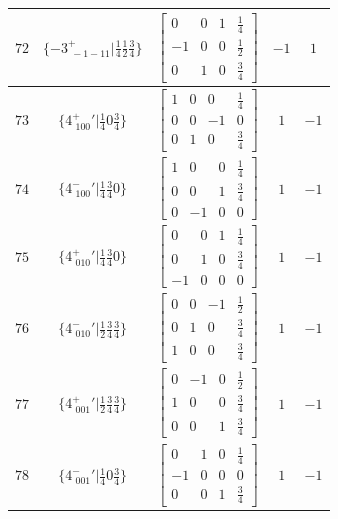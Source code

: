 \documentclass[fleqn,8pt]{jsarticle}
\begin{document}
\begin{longtable}{ccccc}
$ 72 $ & $ \{-3^{+}_{\,\,-1-11}|\frac{1}{4} \frac{1}{2} \frac{3}{4}\} $ & $ \begin{bmatrix} 0 & 0 & 1 & \frac{1}{4} \\ -1 & 0 & 0 & \frac{1}{2} \\ 0 & 1 & 0 & \frac{3}{4} \end{bmatrix} $ & $ -1 $ & $ 1 $ \\ \hline
$ 73 $ & $ \{4^{+}_{\,\,100}{}'|\frac{1}{4} 0 \frac{3}{4}\} $ & $ \begin{bmatrix} 1 & 0 & 0 & \frac{1}{4} \\ 0 & 0 & -1 & 0 \\ 0 & 1 & 0 & \frac{3}{4} \end{bmatrix} $ & $ 1 $ & $ -1 $ \\ \hline
$ 74 $ & $ \{4^{-}_{\,\,100}{}'|\frac{1}{4} \frac{3}{4} 0\} $ & $ \begin{bmatrix} 1 & 0 & 0 & \frac{1}{4} \\ 0 & 0 & 1 & \frac{3}{4} \\ 0 & -1 & 0 & 0 \end{bmatrix} $ & $ 1 $ & $ -1 $ \\ \hline
$ 75 $ & $ \{4^{+}_{\,\,010}{}'|\frac{1}{4} \frac{3}{4} 0\} $ & $ \begin{bmatrix} 0 & 0 & 1 & \frac{1}{4} \\ 0 & 1 & 0 & \frac{3}{4} \\ -1 & 0 & 0 & 0 \end{bmatrix} $ & $ 1 $ & $ -1 $ \\ \hline
$ 76 $ & $ \{4^{-}_{\,\,010}{}'|\frac{1}{2} \frac{3}{4} \frac{3}{4}\} $ & $ \begin{bmatrix} 0 & 0 & -1 & \frac{1}{2} \\ 0 & 1 & 0 & \frac{3}{4} \\ 1 & 0 & 0 & \frac{3}{4} \end{bmatrix} $ & $ 1 $ & $ -1 $ \\ \hline
$ 77 $ & $ \{4^{+}_{\,\,001}{}'|\frac{1}{2} \frac{3}{4} \frac{3}{4}\} $ & $ \begin{bmatrix} 0 & -1 & 0 & \frac{1}{2} \\ 1 & 0 & 0 & \frac{3}{4} \\ 0 & 0 & 1 & \frac{3}{4} \end{bmatrix} $ & $ 1 $ & $ -1 $ \\ \hline
$ 78 $ & $ \{4^{-}_{\,\,001}{}'|\frac{1}{4} 0 \frac{3}{4}\} $ & $ \begin{bmatrix} 0 & 1 & 0 & \frac{1}{4} \\ -1 & 0 & 0 & 0 \\ 0 & 0 & 1 & \frac{3}{4} \end{bmatrix} $ & $ 1 $ & $ -1 $ \\ \hline

\end{longtable}
\end{document}
